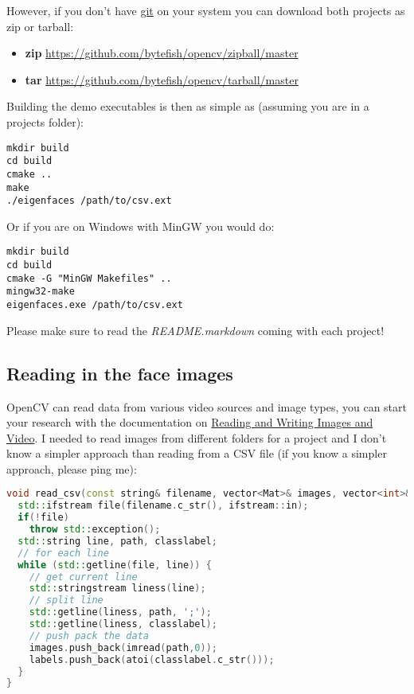 However, if you don't have \href{http://git-scm.com/}{git} on your system you can download both projects as zip or tarball:

\begin{itemize}
	\item \textbf{zip} \url{https://github.com/bytefish/opencv/zipball/master}
	\item \textbf{tar} \url{https://github.com/bytefish/opencv/tarball/master}
\end{itemize}

Building the demo executables is then as simple as (assuming you are in a projects folder):

\begin{lstlisting}
mkdir build
cd build
cmake ..
make
./eigenfaces /path/to/csv.ext
\end{lstlisting}

Or if you are on Windows with MinGW you would do:

\begin{lstlisting}
mkdir build
cd build
cmake -G "MinGW Makefiles" ..
mingw32-make
eigenfaces.exe /path/to/csv.ext
\end{lstlisting}

Please make sure to read the \textit{README.markdown} coming with each project!

\subsection{Reading in the face images}

\lstset{language=,}

OpenCV can read data from various video sources and image types, you can start your research with the documentation on \href{http://opencv.willowgarage.com/documentation/cpp/reading_and_writing_images_and_video.html}{Reading and Writing Images and Video}. I needed to read images from different folders for a project and I don't know a simpler approach than reading from a CSV file (if you know a simpler approach, please ping me):

\begin{lstlisting}[language=c++]
void read_csv(const string& filename, vector<Mat>& images, vector<int>& labels) {
  std::ifstream file(filename.c_str(), ifstream::in);
  if(!file)
    throw std::exception();
  std::string line, path, classlabel;
  // for each line
  while (std::getline(file, line)) {
    // get current line
    std::stringstream liness(line);
    // split line
    std::getline(liness, path, ';');
    std::getline(liness, classlabel);
    // push pack the data
    images.push_back(imread(path,0));
    labels.push_back(atoi(classlabel.c_str()));
  }
}
\end{lstlisting}

